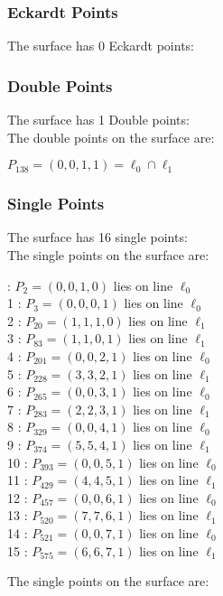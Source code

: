 \documentclass{article}
\begin{document}
{\subsubsection*{Eckardt Points}
The surface has 0 Eckardt points:\\
\subsubsection*{Double Points}
The surface has 1 Double points:\\
The double points on the surface are:\\
\begin{multicols}{2}
\noindent
$P_{138} = ( 0, 0, 1, 1 ) = \ell_{0} \cap \ell_{1} $\\
\end{multicols}
\subsubsection*{Single Points}
The surface has 16 single points:\\
The single points on the surface are:\\
\begin{multicols}{2}
 : $P_{2}=( 0, 0, 1, 0 )$ lies on line $\ell_{0}$\\
1 : $P_{3}=( 0, 0, 0, 1 )$ lies on line $\ell_{0}$\\
2 : $P_{20}=( 1, 1, 1, 0 )$ lies on line $\ell_{1}$\\
3 : $P_{83}=( 1, 1, 0, 1 )$ lies on line $\ell_{1}$\\
4 : $P_{201}=( 0, 0, 2, 1 )$ lies on line $\ell_{0}$\\
5 : $P_{228}=( 3, 3, 2, 1 )$ lies on line $\ell_{1}$\\
6 : $P_{265}=( 0, 0, 3, 1 )$ lies on line $\ell_{0}$\\
7 : $P_{283}=( 2, 2, 3, 1 )$ lies on line $\ell_{1}$\\
8 : $P_{329}=( 0, 0, 4, 1 )$ lies on line $\ell_{0}$\\
9 : $P_{374}=( 5, 5, 4, 1 )$ lies on line $\ell_{1}$\\
10 : $P_{393}=( 0, 0, 5, 1 )$ lies on line $\ell_{0}$\\
11 : $P_{429}=( 4, 4, 5, 1 )$ lies on line $\ell_{1}$\\
12 : $P_{457}=( 0, 0, 6, 1 )$ lies on line $\ell_{0}$\\
13 : $P_{520}=( 7, 7, 6, 1 )$ lies on line $\ell_{1}$\\
14 : $P_{521}=( 0, 0, 7, 1 )$ lies on line $\ell_{0}$\\
15 : $P_{575}=( 6, 6, 7, 1 )$ lies on line $\ell_{1}$\\
\end{multicols}
The single points on the surface are:\\
}
\end{document}
